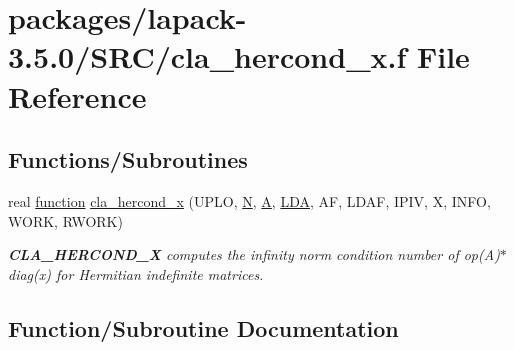 \hypertarget{cla__hercond__x_8f}{}\section{packages/lapack-\/3.5.0/\+S\+R\+C/cla\+\_\+hercond\+\_\+x.f File Reference}
\label{cla__hercond__x_8f}
\subsection*{Functions/\+Subroutines}
\begin{DoxyCompactItemize}
\item 
real \hyperlink{afunc_8m_a7b5e596df91eadea6c537c0825e894a7}{function} \hyperlink{cla__hercond__x_8f_ac8f382f5d0a3af27d8319c82cae7cbba}{cla\+\_\+hercond\+\_\+x} (U\+P\+L\+O, \hyperlink{polmisc_8c_a0240ac851181b84ac374872dc5434ee4}{N}, \hyperlink{classA}{A}, \hyperlink{example__user_8c_ae946da542ce0db94dced19b2ecefd1aa}{L\+D\+A}, A\+F, L\+D\+A\+F, I\+P\+I\+V, X, I\+N\+F\+O, W\+O\+R\+K, R\+W\+O\+R\+K)
\begin{DoxyCompactList}\small\item\em {\bfseries C\+L\+A\+\_\+\+H\+E\+R\+C\+O\+N\+D\+\_\+\+X} computes the infinity norm condition number of op(\+A)$\ast$diag(x) for Hermitian indefinite matrices. \end{DoxyCompactList}\end{DoxyCompactItemize}


\subsection{Function/\+Subroutine Documentation}
\hypertarget{cla__hercond__x_8f_ac8f382f5d0a3af27d8319c82cae7cbba}{}
